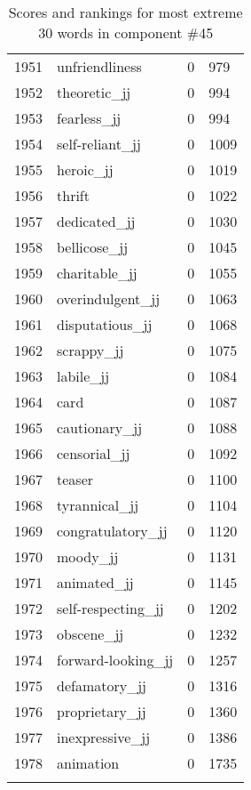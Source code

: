 \begin{longtable}[!htbp]{| rlr@{.}l |}
    1951 & unfriendliness & 0 & 979 \\
    1952 & theoretic\_jj & 0 & 994 \\
    1953 & fearless\_jj & 0 & 994 \\
    1954 & self-reliant\_jj & 0 & 1009 \\
    1955 & heroic\_jj & 0 & 1019 \\
    1956 & thrift & 0 & 1022 \\
    1957 & dedicated\_jj & 0 & 1030 \\
    1958 & bellicose\_jj & 0 & 1045 \\
    1959 & charitable\_jj & 0 & 1055 \\
    1960 & overindulgent\_jj & 0 & 1063 \\
    1961 & disputatious\_jj & 0 & 1068 \\
    1962 & scrappy\_jj & 0 & 1075 \\
    1963 & labile\_jj & 0 & 1084 \\
    1964 & card & 0 & 1087 \\
    1965 & cautionary\_jj & 0 & 1088 \\
    1966 & censorial\_jj & 0 & 1092 \\
    1967 & teaser & 0 & 1100 \\
    1968 & tyrannical\_jj & 0 & 1104 \\
    1969 & congratulatory\_jj & 0 & 1120 \\
    1970 & moody\_jj & 0 & 1131 \\
    1971 & animated\_jj & 0 & 1145 \\
    1972 & self-respecting\_jj & 0 & 1202 \\
    1973 & obscene\_jj & 0 & 1232 \\
    1974 & forward-looking\_jj & 0 & 1257 \\
    1975 & defamatory\_jj & 0 & 1316 \\
    1976 & proprietary\_jj & 0 & 1360 \\
    1977 & inexpressive\_jj & 0 & 1386 \\
    1978 & animation & 0 & 1735 \\
    \hline
    \caption{Scores and rankings for most extreme 30 words in component \#45} \\
\end{longtable}
